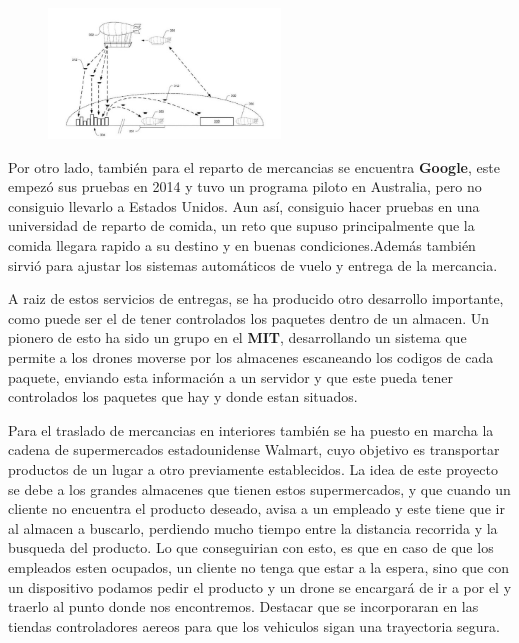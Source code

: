 \begin{figure}[ht]
	\centering
		\includegraphics[width=0.55\textwidth]{imgs/amazon.jpg}
	\label{fig:Esquema de reparto con drones}
\end{figure}

\hspace{1 cm} Por otro lado, tambi\'en para el reparto de mercancias se encuentra \textbf{Google}, este empez\'o sus pruebas en 2014 y tuvo un programa piloto en Australia, pero no consiguio llevarlo a Estados Unidos. Aun as\'i, consiguio hacer pruebas en una universidad de reparto de comida, un reto que supuso principalmente que la comida llegara rapido a su destino y en buenas condiciones.Adem\'as tambi\'en sirvi\'o para ajustar los sistemas autom\'aticos de vuelo y entrega de la mercancia. 

\hspace{1 cm} A raiz de estos servicios de entregas, se ha producido otro desarrollo importante, como puede ser el de tener controlados los paquetes dentro de un almacen. Un pionero de esto ha sido un grupo en el \textbf{MIT}, desarrollando un sistema que permite a los drones moverse por los almacenes escaneando los codigos de cada paquete, enviando esta informaci\'on a un servidor y que este pueda tener controlados los paquetes que hay y donde estan situados. 

\hspace{1 cm} Para el traslado de mercancias en interiores tambi\'en se ha puesto en marcha la cadena de supermercados estadounidense Walmart, cuyo objetivo es transportar productos de un lugar a otro previamente establecidos. La idea de este proyecto se debe a los grandes almacenes que tienen estos supermercados, y que cuando un cliente no encuentra el producto deseado, avisa a un empleado y este tiene que ir al almacen a buscarlo, perdiendo mucho tiempo entre la distancia recorrida y la busqueda del producto. Lo que conseguirian con esto, es que en caso de que los empleados esten ocupados, un cliente no tenga que estar a la espera, sino que con un dispositivo podamos pedir el producto y un drone se encargar\'a de ir a por el y traerlo al punto donde nos encontremos. Destacar que se incorporaran en las tiendas controladores aereos para que los vehiculos sigan una trayectoria segura.  


